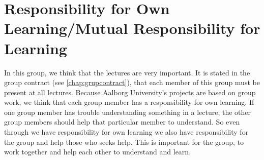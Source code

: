 \section{Responsibility for Own Learning/Mutual Responsibility for Learning}
In this group, we think that the lectures are very important. It is stated in the group contract (see \ref{chap:grupcontract}), that each member of this group must be present at all lectures. Because Aalborg University's projects are based on group work, we think that each group member has a responsibility for own learning. If one group member has trouble understanding something in a lecture, the other group members should help that particular member to understand. So even through we have responsibility for own learning we also have responsibility for the group and help those who seeks help. This is important for the group, to work together and help each other to understand and learn.